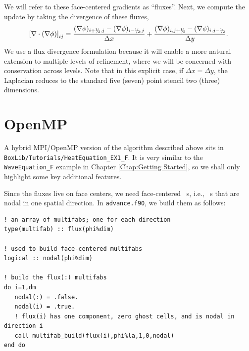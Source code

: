 We will refer to these face-centered gradients as ``fluxes''.
Next, we compute the update by taking the divergence of these fluxes,
\begin{equation}
\left[\nabla\cdot(\nabla\phi)\right]_{ij} = \frac{(\nabla\phi)_{i+\myhalf,j}-(\nabla\phi)_{i-\myhalf,j}}{\Delta x} + \frac{(\nabla\phi)_{i,j+\myhalf}-(\nabla\phi)_{i,j-\myhalf}}{\Delta y}.
\end{equation}
We use a flux divergence formulation because it will enable a more natural 
extension to multiple levels of refinement, where we will be concerned with
conservation across levels.  Note that in this explicit case, if $\Delta x = \Delta y$, 
the Laplacian reduces to the standard five (seven) point stencil two (three) dimensions.  

\section{OpenMP}\label{Sec:OpenMP}

A hybrid MPI/OpenMP version of the algorithm described above sits in 
{\tt BoxLib/Tutorials/HeatEquation\_EX1\_F}.  It is very similar to the
{\tt WaveEquation\_F} example in Chapter \ref{Chap:Getting Started}, so we shall
only highlight some key additional features.

Since the fluxes live on face centers, we need face-centered \MultiFab\ s, i.e.,
\MultiFab\ s that are nodal in one spatial direction.  In {\tt advance.f90},
we build them as follows:
\begin{lstlisting}[backgroundcolor=\color{light-green}]
! an array of multifabs; one for each direction
type(multifab) :: flux(phi%dim) 

! used to build face-centered multifabs
logical :: nodal(phi%dim) 

! build the flux(:) multifabs
do i=1,dm
   nodal(:) = .false.
   nodal(i) = .true.
   ! flux(i) has one component, zero ghost cells, and is nodal in direction i
   call multifab_build(flux(i),phi%la,1,0,nodal)
end do
\end{lstlisting}

